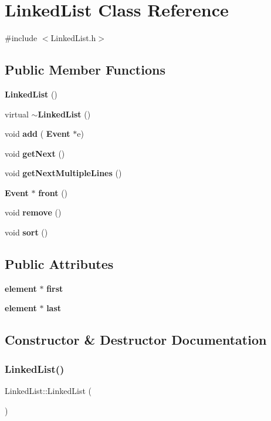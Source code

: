 \section{Linked\+List Class Reference}
\label{classLinkedList}


{\ttfamily \#include $<$Linked\+List.\+h$>$}

\subsection*{Public Member Functions}
\begin{DoxyCompactItemize}
\item 
\textbf{ Linked\+List} ()
\item 
virtual \textbf{ $\sim$\+Linked\+List} ()
\item 
void \textbf{ add} (\textbf{ Event} $\ast$e)
\item 
void \textbf{ get\+Next} ()
\item 
void \textbf{ get\+Next\+Multiple\+Lines} ()
\item 
\textbf{ Event} $\ast$ \textbf{ front} ()
\item 
void \textbf{ remove} ()
\item 
void \textbf{ sort} ()
\end{DoxyCompactItemize}
\subsection*{Public Attributes}
\begin{DoxyCompactItemize}
\item 
\textbf{ element} $\ast$ \textbf{ first}
\item 
\textbf{ element} $\ast$ \textbf{ last}
\end{DoxyCompactItemize}


\subsection{Constructor \& Destructor Documentation}
\mbox{\label{classLinkedList_afe7f78983e173f8018927cf2ad11a5aa}} 
\subsubsection{Linked\+List()}
{\footnotesize\ttfamily Linked\+List\+::\+Linked\+List (\begin{DoxyParamCaption}{ }\end{DoxyParamCaption})}



